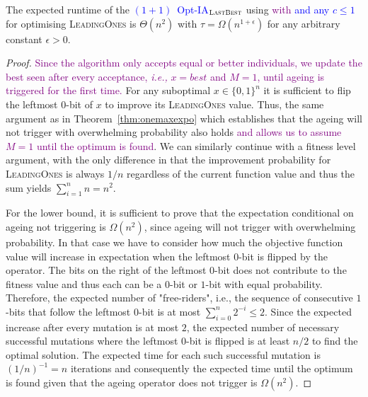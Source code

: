 \documentclass[lettersize,journal]{IEEEtran}
\newcommand{\new}[1]{\textcolor{blue}{#1}}
\begin{document}
\begin{theorem} \label{thm:leadingonesexpo}
	The expected runtime of  the \new{$(1+1)$~Opt-IA$_{\textsc{LastBest}}$} using \IPHfcm{}  %
	\textcolor{purple}{ with {\linHD }} \new{and any $c\leq 1$} for optimising
	\textsc{LeadingOnes} is $\Theta(n^2)$ with $\tau=\Omega(n^{1+\epsilon})$ {\color{blue}for any arbitrary} 
	constant $\epsilon>0$.
\end{theorem}
\begin{proof}
	

\textcolor{purple}{Since the algorithm only accepts equal or better individuals, we update the best seen after every acceptance, \emph{i.e.,} $x=best$ and $M=1$, until ageing is triggered for the first time.  }
For any suboptimal $x\in\{0,1\}^n$ it is sufficient to flip the leftmost $0$-bit of $x$ to improve its \textsc{LeadingOnes} value. Thus, the same argument as in Theorem~\ref{thm:onemaxexpo} which establishes that the ageing will not trigger with overwhelming probability also holds \textcolor{purple}{and allows us to assume $M=1$ until the optimum is found}. We can similarly continue with a fitness level argument, {\color{blue} with the only difference in that} the improvement probability for \textsc{LeadingOnes} is always $1/n$ regardless of the current function value and thus the sum yields $\sum\limits_{i=1}^{n}n = n^2$.

For the lower bound, it is sufficient to prove that the {\color{blue}expectation conditional on ageing not triggering} is $\Omega(n^2)$, since ageing will not trigger with overwhelming probability. In that case we have to consider how much the objective function value will increase in expectation when the leftmost $0$-bit is flipped by the operator. The bits on the right of the leftmost $0$-bit does not contribute to the fitness value and thus each can be a $0$-bit or $1$-bit with equal probability. Therefore, the expected number of "free-riders", i.e., the sequence of consecutive $1$-bits that follow the leftmost $0$-bit is at most $\sum_{i=0}^{n}2^{-i}\leq 2$. Since the expected increase after every mutation is at most $2$, the expected number of necessary successful mutations where the leftmost $0$-bit is flipped is at least $n/2$ to find the optimal solution. The expected time for each such successful mutation is $(1/n)^{-1}=n$ iterations and consequently the expected time until the optimum is found given that the ageing operator does not trigger is $\Omega(n^2)$.  
	
\end{proof}
\end{document}
